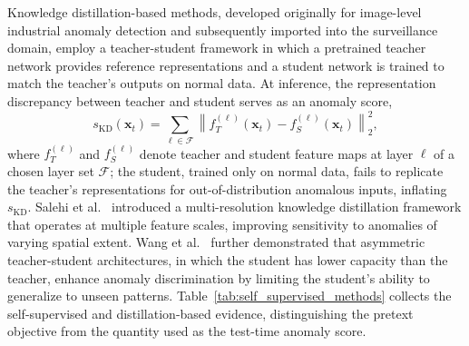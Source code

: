 \documentclass[10pt,a4paper]{article}
\begin{document}
Knowledge distillation-based methods, developed originally for image-level industrial anomaly detection and subsequently imported into the surveillance domain, employ a teacher-student framework in which a pretrained teacher network provides reference representations and a student network is trained to match the teacher's outputs on normal data. At inference, the representation discrepancy between teacher and student serves as an anomaly score,
\begin{equation}
    s_{\text{KD}}(\mathbf{x}_t) = \sum_{\ell \in \mathcal{F}} \left\| f_T^{(\ell)}(\mathbf{x}_t) - f_S^{(\ell)}(\mathbf{x}_t) \right\|_2^2, \label{eq:kd_score}
\end{equation}
where $f_T^{(\ell)}$ and $f_S^{(\ell)}$ denote teacher and student feature maps at layer $\ell$ of a chosen layer set $\mathcal{F}$; the student, trained only on normal data, fails to replicate the teacher's representations for out-of-distribution anomalous inputs, inflating $s_{\text{KD}}$. Salehi et al.~\citeyearpar{salehi2021multiresolution} introduced a multi-resolution knowledge distillation framework that operates at multiple feature scales, improving sensitivity to anomalies of varying spatial extent. Wang et al.~\citeyearpar{wang2021student} further demonstrated that asymmetric teacher-student architectures, in which the student has lower capacity than the teacher, enhance anomaly discrimination by limiting the student's ability to generalize to unseen patterns. Table~\ref{tab:self_supervised_methods} collects the self-supervised and distillation-based evidence, distinguishing the pretext objective from the quantity used as the test-time anomaly score.
\end{document}
